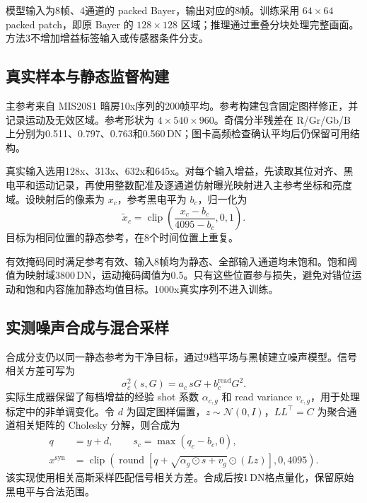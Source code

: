 \documentclass[11pt,a4paper,UTF8,fontset=fandol]{ctexart}
\newcommand{\dn}{\ensuremath{\,\mathrm{DN}}}
\begin{document}
模型输入为8帧、4通道的 packed Bayer，输出对应的8帧。训练采用 $64\times64$ packed patch，即原 Bayer 的 $128\times128$ 区域；推理通过重叠分块处理完整画面。方法3不增加增益标签输入或传感器条件分支。

\subsection{真实样本与静态监督构建}

主参考来自 MIS20S1 暗房10x序列的200帧平均。参考构建包含固定图样修正，并记录运动及无效区域。参考形状为 $4\times540\times960$。奇偶分半残差在 R/Gr/Gb/B 上分别为0.511、0.797、0.763和0.560\dn；图卡高频检查确认平均后仍保留可用结构。

真实输入选用128x、313x、632x和645x。对每个输入增益，先读取其位对齐、黑电平和运动记录，再使用整数配准及逐通道仿射曝光映射进入主参考坐标和亮度域。设映射后的像素为 $x_c$，参考黑电平为 $b_c$，归一化为
\begin{equation}
 \widetilde{x}_c=\operatorname{clip}\left(\frac{x_c-b_c}{4095-b_c},0,1\right).
 \label{eq:normalization}
\end{equation}
目标为相同位置的静态参考，在8个时间位置上重复。

有效掩码同时满足参考有效、输入8帧均为静态、全部输入通道均未饱和。饱和阈值为映射域3800\dn，运动掩码阈值为0.5。只有这些位置参与损失，避免对错位运动和饱和内容施加静态均值目标。1000x真实序列不进入训练。

\subsection{实测噪声合成与混合采样}

合成分支仍以同一静态参考为干净目标，通过9档平场与黑帧建立噪声模型。信号相关方差可写为
\begin{equation}
 \sigma_c^2(s,G)=a_c\,sG+b_c^{\mathrm{read}}G^2.
\end{equation}
实际生成器保留了每档增益的经验 shot 系数 $\alpha_{c,g}$ 和 read variance $v_{c,g}$，用于处理标定中的非单调变化。令 $d$ 为固定图样偏置，$z\sim\mathcal N(0,I)$，$LL^\top=C$ 为聚合通道相关矩阵的 Cholesky 分解，则合成为
\begin{align}
 q &= y+d,\qquad s_c=\max(q_c-b_c,0),\\
 x^{\mathrm{syn}} &= \operatorname{clip}\left(
 \operatorname{round}\left[q+\sqrt{\alpha_g\odot s+v_g}\odot(Lz)\right],0,4095\right).
 \label{eq:synthetic}
\end{align}
该实现使用相关高斯采样匹配信号相关方差。合成后按1\dn{}格点量化，保留原始黑电平与合法范围。
\end{document}
